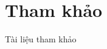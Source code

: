 
\section{Tham khảo}
\begin{frame}[allowframebreaks]{Tài liệu tham khảo}
    \printbibliography
\end{frame}